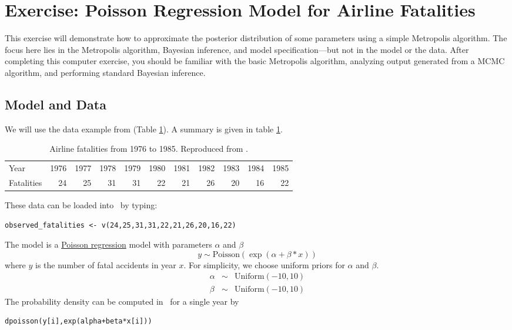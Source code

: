 \newpage
\FloatBarrier
\section{Exercise: Poisson Regression Model for Airline Fatalities}

This exercise will demonstrate how to approximate the posterior distribution of some parameters using a simple Metropolis algorithm. 
The focus here lies in the Metropolis algorithm, Bayesian inference, and model specification---but not in the model or the data. 
After completing this computer exercise, you should be familiar with the basic Metropolis algorithm, analyzing output generated from a MCMC algorithm, and performing standard Bayesian inference.

\subsection{Model and Data}
We will use the data example from \cite{gelman95} (Table \ref{tab:airlineFatalities}). 
A summary is given in table \ref{tab:airlineFatalities}.
\begin{table}[!hbtp]
\caption{Airline fatalities from 1976 to 1985. Reproduced from \cite[][Table 2.2 on p. 69]{gelman95}.}
\label{tab:airlineFatalities}
\smallskip
\centering
\begin{tabular}{ l | r r r r r r r r r r }
  \hline                       
  Year & 1976 & 1977 & 1978 & 1979 & 1980 & 1981 & 1982 & 1983 & 1984 & 1985 \\
  Fatalities & 24 & 25 & 31 & 31 & 22 & 21 & 26 & 20 & 16 & 22\\
  \hline  
\end{tabular}
\end{table}

These data can be loaded into \RevBayes~by typing:
{\tt \begin{snugshade*}
\begin{lstlisting}    
observed_fatalities <- v(24,25,31,31,22,21,26,20,16,22)
\end{lstlisting}
\end{snugshade*}}

The model is a \href{http://en.wikipedia.org/wiki/Poisson_regression}{Poisson regression} model with parameters $\alpha$ and $\beta$
\begin{equation*}
y \sim \text{Poisson}(\exp(\alpha+\beta*x))
\end{equation*} 
where $y$ is the number of fatal accidents in year $x$. 
For simplicity, we choose uniform priors for $\alpha$ and $\beta$.
\begin{eqnarray*}
\alpha & \sim & \text{Uniform}(-10,10)\\
\beta &  \sim & \text{Uniform}(-10,10)
\end{eqnarray*}
The probability density can be computed in \RevBayes~for a single year by
{\tt \begin{snugshade*}
\begin{lstlisting}    
dpoisson(y[i],exp(alpha+beta*x[i]))
\end{lstlisting}
\end{snugshade*}}

